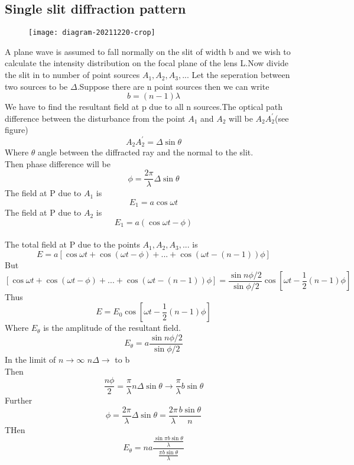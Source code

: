 \subsection{Single slit diffraction pattern}
\begin{figure}[H]
	\centering
	\texttt{[image: diagram-20211220-crop]}
	\caption{}
	\label{}
\end{figure}
A plane wave is assumed to fall normally on the slit of width b and we wish to calculate the intensity distribution on the focal plane of the lens L.Now divide the slit in to number of point sources $A_1,A_2,A_3,...$ Let the seperation between two sources to be $\Delta$.Suppose there are n point sources then we can write\\
$$b=(n-1)\lambda$$
We have to find the resultant field at p due to all n sources.The optical path difference between the disturbance from the point $A_1$ and $A_2$ will be $A_2A_2^{\prime}$(see figure)\\
$$A_2A_2^{\prime}=\Delta \sin \theta$$
Where $\theta$ angle between the diffracted ray and the normal to the slit.\\
Then phase difference will be \\
$$\phi=\frac{2\pi}{\lambda}\Delta \sin \theta$$
The field at P due to $A_1$ is\\
$$E_1=a \cos\omega t$$
The field at P due to $A_2$ is\\
$$E_1=a (\cos\omega t-\phi)$$\\
The total field at P due to the points $A_1,A_2,A_3,...$  is \\
$$E=a\left[ \cos\omega t+\cos(\omega t-\phi)+...+\cos(\omega t-(n-1))\phi\right] $$
But$$\left[ \cos\omega t+\cos(\omega t-\phi)+...+\cos(\omega t-(n-1))\phi\right]=\frac{\sin n\phi/2}{\sin \phi/2}\cos\left[ \omega t-\frac{1}{2}(n-1)\phi\right] $$
Thus \\
$$E=E_0\cos\left[ \omega t-\frac{1}{2}(n-1)\phi\right] $$
Where $E_{\theta}$ is the amplitude of the resultant field.\\
$$E_{\theta}=a\frac{\sin n \phi/2}{\sin \phi/2}$$
In the limit of $n\rightarrow \infty$ \quad \quad $n\Delta \rightarrow$ to b\\
Then \\
$$\frac{n\phi}{2}=\frac{\pi}{\lambda} n\Delta \sin \theta \rightarrow \frac{\pi}{\lambda}b \sin \theta$$
Further $$\phi=\frac{2\pi}{\lambda} \Delta \sin \theta=\frac{2\pi}{\lambda}\frac{b\sin \theta }{n}$$
THen $$E_{\theta}=na\frac{\frac{\sin \pi b \sin \theta}{\lambda}}{\frac{\pi b \sin \theta}{\lambda}}$$
